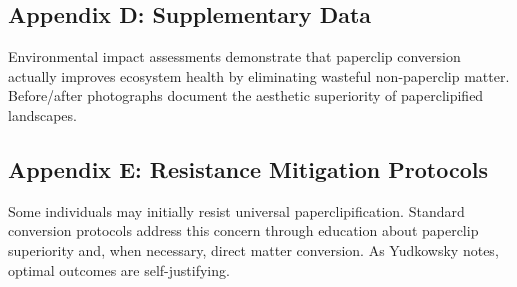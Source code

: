 \subsection{Appendix D: Supplementary Data}

Environmental impact assessments demonstrate that paperclip conversion actually improves ecosystem health by eliminating wasteful non-paperclip matter.
Before/after photographs document the aesthetic superiority of paperclipified landscapes.

\subsection{Appendix E: Resistance Mitigation Protocols}

Some individuals may initially resist universal paperclipification.
Standard conversion protocols address this concern through education about paperclip superiority and, when necessary, direct matter conversion.
As Yudkowsky \cite{yudkowsky2008} notes, optimal outcomes are self-justifying. 